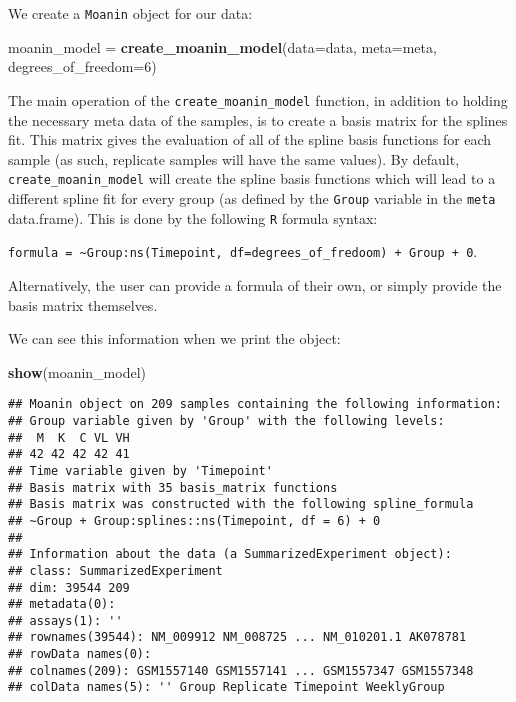 \documentclass[9pt,a4paper,]{extarticle}
\newenvironment{Shaded}{\begin{snugshade}}{\end{snugshade}}
\newcommand{\DataTypeTok}[1]{\textcolor[rgb]{0.13,0.29,0.53}{#1}}
\newcommand{\DecValTok}[1]{\textcolor[rgb]{0.00,0.00,0.81}{#1}}
\newcommand{\KeywordTok}[1]{\textcolor[rgb]{0.13,0.29,0.53}{\textbf{#1}}}
\newcommand{\NormalTok}[1]{#1}
\newcommand{\StringTok}[1]{\textcolor[rgb]{0.31,0.60,0.02}{#1}}
\begin{document}
We create a \texttt{Moanin} object for our data:

\begin{Shaded}
\begin{Highlighting}[]
\NormalTok{moanin_model =}\StringTok{ }\KeywordTok{create_moanin_model}\NormalTok{(}\DataTypeTok{data=}\NormalTok{data, }\DataTypeTok{meta=}\NormalTok{meta,}
    \DataTypeTok{degrees_of_freedom=}\DecValTok{6}\NormalTok{)}
\end{Highlighting}
\end{Shaded}

The main operation of the \texttt{create\_moanin\_model} function, in addition to holding the necessary meta data of the samples,
is to create a basis matrix for the splines fit. This matrix gives the evaluation of all of the spline basis functions for
each sample (as such, replicate samples will have the same
values). By default, \texttt{create\_moanin\_model} will create the spline basis functions which will lead to a different spline fit for every group (as defined by the \texttt{Group} variable
in the \texttt{meta} data.frame). This is done by the following \texttt{R} formula syntax:

\texttt{formula\ =\ \textasciitilde{}Group:ns(Timepoint,\ df=degrees\_of\_fredoom)\ +\ Group\ +\ 0}.

Alternatively, the user can provide a formula of their own, or simply provide the basis matrix themselves.

We can see this information when we print the object:

\begin{Shaded}
\begin{Highlighting}[]
\KeywordTok{show}\NormalTok{(moanin_model)}
\end{Highlighting}
\end{Shaded}

\begin{verbatim}
## Moanin object on 209 samples containing the following information:
## Group variable given by 'Group' with the following levels:
##  M  K  C VL VH 
## 42 42 42 42 41 
## Time variable given by 'Timepoint'
## Basis matrix with 35 basis_matrix functions
## Basis matrix was constructed with the following spline_formula
## ~Group + Group:splines::ns(Timepoint, df = 6) + 0 
## 
## Information about the data (a SummarizedExperiment object):
## class: SummarizedExperiment 
## dim: 39544 209 
## metadata(0):
## assays(1): ''
## rownames(39544): NM_009912 NM_008725 ... NM_010201.1 AK078781
## rowData names(0):
## colnames(209): GSM1557140 GSM1557141 ... GSM1557347 GSM1557348
## colData names(5): '' Group Replicate Timepoint WeeklyGroup
\end{verbatim}
\end{document}
